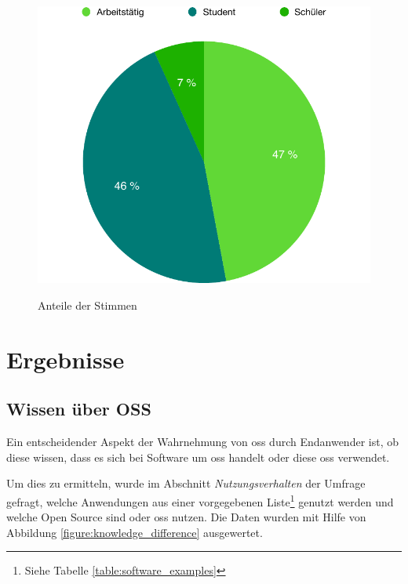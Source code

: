 \documentclass[a4paper]{article}
\begin{document}
\begin{figure}[h]
            \centering
            \begin{minipage}{.5\textwidth}
                \centering
                \includegraphics[width=\textwidth]{assets/results/validity/rowsPerActivity}
                \label{fig:rowsPer:activity}
            \end{minipage}
            \caption{Anteile der Stimmen}
        \end{figure}

    \section{Ergebnisse}
        \subsection{Wissen über OSS}
            Ein entscheidender Aspekt der Wahrnehmung von \gls{oss} durch Endanwender ist, ob diese wissen, dass es sich bei Software um \gls{oss} handelt oder diese \gls{oss} verwendet.
            
            Um dies zu ermitteln, wurde im Abschnitt \emph{Nutzungsverhalten} der Umfrage gefragt, welche Anwendungen aus einer vorgegebenen Liste\footnote{Siehe Tabelle \ref{table:software_examples}} genutzt werden und welche Open Source sind oder \gls{oss} nutzen. Die Daten wurden mit Hilfe von Abbildung \ref{figure:knowledge_difference} ausgewertet.
            
\end{document}
